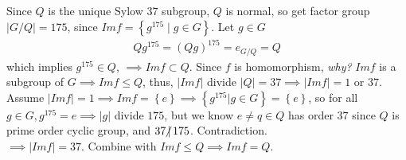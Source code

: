 \documentclass{article}
\begin{document}
\begin{homeworkProblem}
    Since $Q$ is the unique Sylow $37$ subgroup, $Q$ is normal, 
    so get factor group $\lvert G/Q\rvert = 175$,
    since $Im f = \left\{ g^{175} \mid g \in G \right\}$.
    Let $g \in G$ 
    \begin{align}
        Qg^{175} = (Qg)^{175} = e_{G/Q} = Q
    \end{align}
    which implies $g^{175} \in Q$,
    $\implies Im f \subset Q$.
    Since $f$ is homomorphism, \textit{why?}
    $Im f$ is a subgroup of $G \implies Im f \leq Q$, 
    thus, $\lvert Im f\rvert$ divide $\lvert Q \rvert = 37 \implies \lvert Im f\rvert = 1$ or $37$.\\
    Assume $\lvert Im f\rvert = 1 \implies Im f = \left\{ e\right\} \implies \left\{ g^{175} | g \in G\right\} = \left\{ e \right\}$,
    so for all $g \in G, g^{175} = e \implies \lvert g \rvert$ divide $175$, but 
    we know $e \neq q \in Q$ has order $37$ since $Q$ is 
    prime order cyclic group, and $37 \hspace{-4pt}\not| \hspace{2pt} 175$. 
    Contradiction.\\
    $\implies \lvert Im f\rvert = 37$. Combine
    with $Im f \leq Q \implies Im f = Q$.\\



    
\end{homeworkProblem}

\pagebreak
\end{document}
